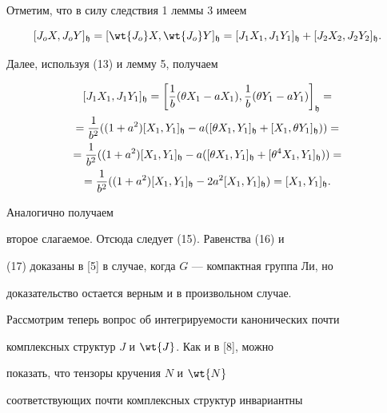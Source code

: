 \begin{pf}


Отметим, что в силу следствия 1 леммы 3 имеем


$$


[J_oX,J_oY]_{\frak{h}}=[ \wt{J_o}X,


\wt{J_o}Y]_{\frak{h}}=[J_1X_1,J_1Y_1]_{\frak{h}}+[J_2X_2,J_2Y_2]_{\frak{h}}.


$$


Далее, используя (13) и лемму 5, получаем


\begin{multline*}


[J_1X_1,J_1Y_1]_{\frak{h}}=\bigg[\frac{1}{b}(\theta


X_1-aX_1),\frac{1}{b}(\theta Y_1-aY_1)\bigg]_{\frak{h}}=\\


%


=\frac{1}{b^2}((1+a^2)[X_1,Y_1]_{\frak{h}}-a([\theta


X_1,Y_1]_{\frak{h}}+[X_1,\theta Y_1]_{\frak{h}}))= \\


%


=\frac{1}{b^2}((1+a^2)[X_1,Y_1]_{\frak{h}}-a([\theta


X_1,Y_1]_{\frak{h}}+[\theta^4X_1, Y_1]_{\frak{h}}))= \\


%


=\frac{1}{b^2}((1+a^2)[X_1,Y_1]_{\frak{h}}-


2a^2[X_1,Y_1]_{\frak{h}})=[X_1,Y_1]_{\frak{h}}.


\end{multline*}


Аналогично получаем


второе слагаемое. Отсюда следует (15). Равенства (16) и


(17) доказаны в [5] в случае, когда $G$ --- компактная группа Ли, но


доказательство остается верным и в произвольном случае.


\end{pf}





Рассмотрим теперь вопрос об интегрируемости канонических почти


комплексных структур $J$ и $ \wt{J}$. Как и в [8], можно


показать, что тензоры кручения $N$ и $ \wt{N}$


соответствующих почти комплексных структур инвариантны


